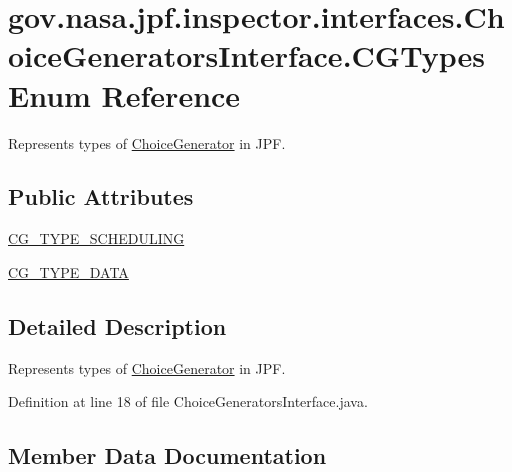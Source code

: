 \hypertarget{enumgov_1_1nasa_1_1jpf_1_1inspector_1_1interfaces_1_1_choice_generators_interface_1_1_c_g_types}{}\section{gov.\+nasa.\+jpf.\+inspector.\+interfaces.\+Choice\+Generators\+Interface.\+C\+G\+Types Enum Reference}
\label{enumgov_1_1nasa_1_1jpf_1_1inspector_1_1interfaces_1_1_choice_generators_interface_1_1_c_g_types}


Represents types of \hyperlink{}{Choice\+Generator} in J\+PF.  


\subsection*{Public Attributes}
\begin{DoxyCompactItemize}
\item 
\hyperlink{enumgov_1_1nasa_1_1jpf_1_1inspector_1_1interfaces_1_1_choice_generators_interface_1_1_c_g_types_a766b066ef3d860ada857acf368c3c860}{C\+G\+\_\+\+T\+Y\+P\+E\+\_\+\+S\+C\+H\+E\+D\+U\+L\+I\+NG}
\item 
\hyperlink{enumgov_1_1nasa_1_1jpf_1_1inspector_1_1interfaces_1_1_choice_generators_interface_1_1_c_g_types_a62ff2dda9e8bee4c9941b0660b4865c4}{C\+G\+\_\+\+T\+Y\+P\+E\+\_\+\+D\+A\+TA}
\end{DoxyCompactItemize}


\subsection{Detailed Description}
Represents types of \hyperlink{}{Choice\+Generator} in J\+PF. 

Definition at line 18 of file Choice\+Generators\+Interface.\+java.



\subsection{Member Data Documentation}
